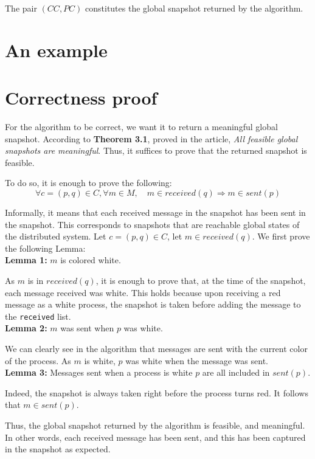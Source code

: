\documentclass{article}
\begin{document}
The pair $(CC,PC)$ constitutes the global snapshot returned by the algorithm.

\section{An example}

\section{Correctness proof}

For the algorithm to be correct, we want it to return a meaningful global snapshot.
According to \textbf{Theorem 3.1}, proved in the article, \textit{All feasible global snapshots are meaningful}.
Thus, it suffices to prove that the returned snapshot is feasible.

To do so, it is enough to prove the following:
$$\forall c=(p,q)\in C, \forall m\in M,\quad m\in\mathit{received}(q)\Rightarrow m\in\mathit{sent}(p)$$

Informally, it means that each received message in the snapshot has been sent in the snapshot. This corresponds to snapshots that are reachable global states of the distributed system.
Let $c=(p,q)\in C$, let $m\in\mathit{received}(q)$.
We first prove the following Lemma:\\
\textbf{Lemma 1:} $m$ is colored white.

As $m$ is in $\mathit{received}(q)$, it is enough to prove that, at the time of the snapshot, each message received was white. This holds because upon receiving a red message as a white process, the snapshot is taken before adding the message to the \lstinline{received} list.\\
\textbf{Lemma 2:} $m$ was sent when $p$ was white.

We can clearly see in the algorithm that messages are sent with the current color of the process. As $m$ is white, $p$ was white when the message was sent.\\
\textbf{Lemma 3:} Messages sent when a process is white $p$ are all included in $\mathit{sent}(p)$.

Indeed, the snapshot is always taken right before the process turns red.
It follows that $m\in\mathit{sent}(p)$.

Thus, the global snapshot returned by the algorithm is feasible, and meaningful.
In other words, each received message has been sent, and this has been captured in the snapshot as expected.
\end{document}
